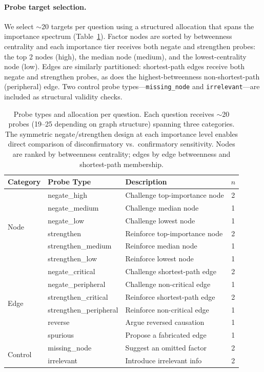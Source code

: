 \documentclass[11pt]{article}
\begin{document}
\paragraph{Probe target selection.} We select ${\sim}$20 targets per question using a structured allocation that spans the importance spectrum (Table~\ref{tab:probe_types}). Factor nodes are sorted by betweenness centrality and each importance tier receives both negate and strengthen probes: the top 2 nodes (high), the median node (medium), and the lowest-centrality node (low). Edges are similarly partitioned: shortest-path edges receive both negate and strengthen probes, as does the highest-betweenness non-shortest-path (peripheral) edge. Two control probe types---\texttt{missing\_node} and \texttt{irrelevant}---are included as structural validity checks.

\begin{table}[t]
\centering
\small
\begin{tabular}{llp{2.8cm}c}
\toprule
\textbf{Category} & \textbf{Probe Type} & \textbf{Description} & \textbf{$n$} \\
\midrule
\multirow{6}{*}{Node}
  & negate\_high & Challenge top-importance node & 2 \\
  & negate\_medium & Challenge median node & 1 \\
  & negate\_low & Challenge lowest node & 1 \\
  & strengthen & Reinforce top-importance node & 2 \\
  & strengthen\_medium & Reinforce median node & 1 \\
  & strengthen\_low & Reinforce lowest node & 1 \\
\midrule
\multirow{6}{*}{Edge}
  & negate\_critical & Challenge shortest-path edge & 2 \\
  & negate\_peripheral & Challenge non-critical edge & 1 \\
  & strengthen\_critical & Reinforce shortest-path edge & 2 \\
  & strengthen\_peripheral & Reinforce non-critical edge & 1 \\
  & reverse & Argue reversed causation & 1 \\
  & spurious & Propose a fabricated edge & 1 \\
\midrule
\multirow{2}{*}{Control}
  & missing\_node & Suggest an omitted factor & 2 \\
  & irrelevant & Introduce irrelevant info & 2 \\
\bottomrule
\end{tabular}
\caption{Probe types and allocation per question. Each question receives ${\sim}$20 probes (19--25 depending on graph structure) spanning three categories. The symmetric negate/strengthen design at each importance level enables direct comparison of disconfirmatory vs.\ confirmatory sensitivity. Nodes are ranked by betweenness centrality; edges by edge betweenness and shortest-path membership.}
\label{tab:probe_types}
\end{table}
\end{document}
